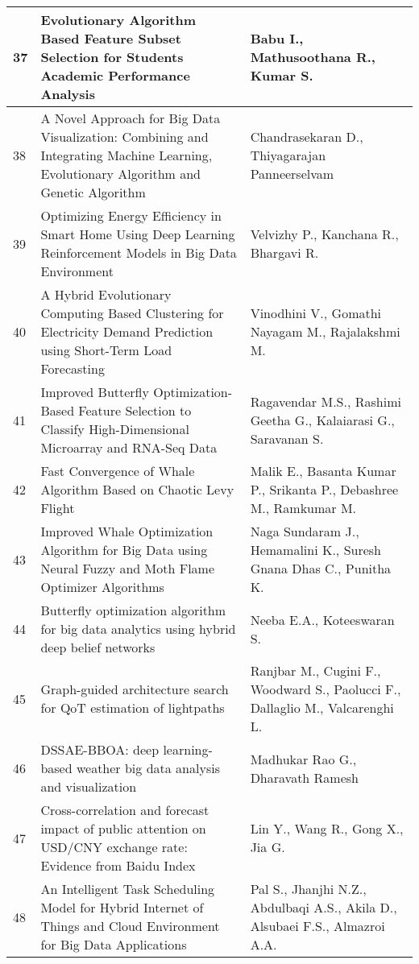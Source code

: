 \begin{landscape}
\begin{longtable}{|p{0.5cm}|p{9cm}|p{7cm}|}
    \hline
    37 & Evolutionary Algorithm Based Feature Subset Selection for Students Academic Performance Analysis & Babu I., Mathusoothana R., Kumar S. \\
    \hline
    38 & A Novel Approach for Big Data Visualization: Combining and Integrating Machine Learning, Evolutionary Algorithm and Genetic Algorithm & Chandrasekaran D., Thiyagarajan Panneerselvam \\
    \hline
    39 & Optimizing Energy Efficiency in Smart Home Using Deep Learning Reinforcement Models in Big Data Environment & Velvizhy P., Kanchana R., Bhargavi R. \\
    \hline
    40 & A Hybrid Evolutionary Computing Based Clustering for Electricity Demand Prediction using Short-Term Load Forecasting & Vinodhini V., Gomathi Nayagam M., Rajalakshmi M. \\
    \hline
    41 & Improved Butterfly Optimization-Based Feature Selection to Classify High-Dimensional Microarray and RNA-Seq Data & Ragavendar M.S., Rashimi Geetha G., Kalaiarasi G., Saravanan S. \\
    \hline
    42 & Fast Convergence of Whale Algorithm Based on Chaotic Levy Flight & Malik E., Basanta Kumar P., Srikanta P., Debashree M., Ramkumar M. \\
    \hline
    43 & Improved Whale Optimization Algorithm for Big Data using Neural Fuzzy and Moth Flame Optimizer Algorithms & Naga Sundaram J., Hemamalini K., Suresh Gnana Dhas C., Punitha K. \\
    \hline
    44 & Butterfly optimization algorithm for big data analytics using hybrid deep belief networks & Neeba E.A., Koteeswaran S. \\
    \hline
    45 & Graph-guided architecture search for QoT estimation of lightpaths & Ranjbar M., Cugini F., Woodward S., Paolucci F., Dallaglio M., Valcarenghi L. \\
    \hline
    46 & DSSAE-BBOA: deep learning-based weather big data analysis and visualization & Madhukar Rao G., Dharavath Ramesh \\
    \hline
    47 & Cross-correlation and forecast impact of public attention on USD/CNY exchange rate: Evidence from Baidu Index & Lin Y., Wang R., Gong X., Jia G. \\
    \hline
    48 & An Intelligent Task Scheduling Model for Hybrid Internet of Things and Cloud Environment for Big Data Applications & Pal S., Jhanjhi N.Z., Abdulbaqi A.S., Akila D., Alsubaei F.S., Almazroi A.A. \\
    \hline

\end{longtable}
\end{landscape}
